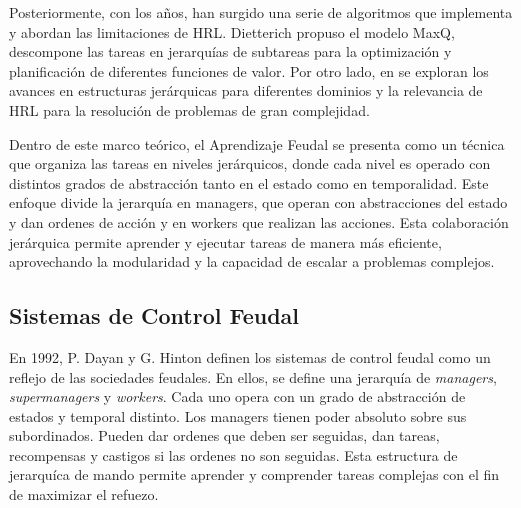 \documentclass[letterpaper]{article} %
\begin{document}
Posteriormente, con los años, han surgido una serie de algoritmos que implementa y abordan las limitaciones de HRL. 
Dietterich \cite{dietterich2000hierarchical} propuso el modelo MaxQ, descompone las tareas en jerarquías de subtareas
para la optimización y planificación de diferentes funciones de valor. Por otro lado, en \cite{barto2003recent} se exploran 
los avances en estructuras jerárquicas para diferentes dominios y la relevancia de HRL para la resolución de problemas de 
gran complejidad.  

Dentro de este marco teórico, el Aprendizaje Feudal se presenta como un técnica que organiza las tareas en niveles jerárquicos, donde cada nivel 
es operado con distintos grados de abstracción tanto en el estado como en temporalidad. Este enfoque \cite{dayan1992feudal} divide la jerarquía en managers, que operan con abstracciones 
del estado y dan ordenes de acción y en workers que realizan las acciones. Esta colaboración jerárquica permite aprender y ejecutar tareas de manera más eficiente, aprovechando
la modularidad y la capacidad de escalar a problemas complejos.

\subsection{Sistemas de Control Feudal}
En 1992, P. Dayan y G. Hinton \cite{dayan1992feudal} definen los sistemas de control feudal como un reflejo de las sociedades feudales. En ellos, se 
define una jerarquía de \textit{managers}, \textit{supermanagers} y \textit{workers}. Cada uno opera con un grado de abstracción de estados y temporal
distinto. Los managers tienen poder absoluto sobre sus subordinados. Pueden dar ordenes que deben ser seguidas, dan tareas, recompensas y castigos si 
las ordenes no son seguidas. Esta estructura de jerarquíca de mando permite aprender y comprender tareas complejas con el fin de maximizar el refuezo.
\end{document}
